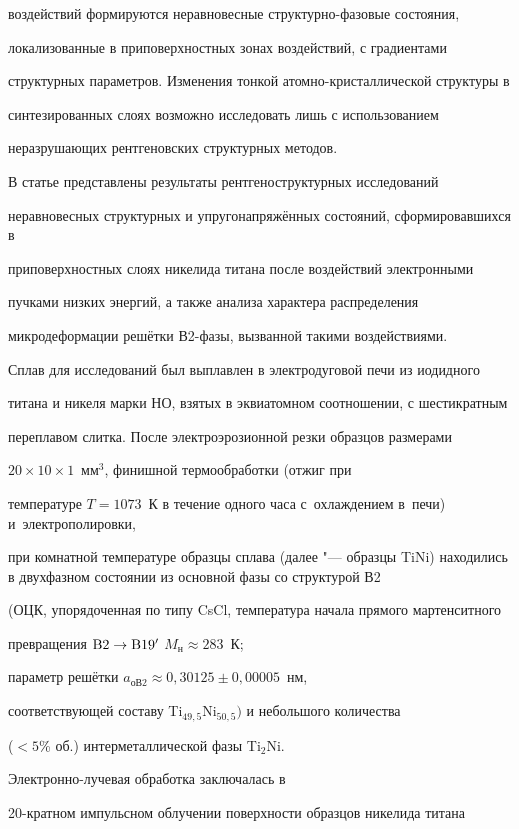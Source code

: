воздействий формируются неравновесные структурно-фазовые состояния,

локализованные в приповерхностных зонах воздействий, с градиентами

структурных параметров. Изменения тонкой атомно-кристаллической структуры в

синтезированных слоях возможно исследовать лишь с использованием

неразрушающих рентгеновских структурных методов.



В статье представлены результаты рентгеноструктурных исследований

неравновесных структурных и упругонапряжённых состояний, сформировавшихся в

приповерхностных слоях никелида титана после воздействий электронными

пучками низких энергий, а также анализа характера распределения

микродеформации решётки В2-фазы, вызванной такими воздействиями.



Сплав для исследований был выплавлен в электродуговой печи из иодидного

титана и никеля марки НО, взятых в эквиатомном соотношении, с шестикратным

переплавом слитка. После электроэрозионной резки образцов размерами

$20\times 10\times 1$~мм$^{3}$, финишной термообработки (отжиг при

температуре $T=1073$~К в течение одного часа с~охлаждением в~печи) и~электрополировки,

при комнатной температуре образцы сплава (далее "--- образцы TiNi) находились в двухфазном состоянии из основной фазы со структурой В2

(ОЦК, упорядоченная по типу CsCl, температура начала прямого мартенситного

превращения $\rm B2\to B19'$ $M_{\text{н}}\approx 283$~К;

параметр решётки $a_{\text{оВ2}}\approx 0,30125\pm 0,00005$~нм,

соответствующей составу Ti$_{49,5}$Ni$_{50,5})$ и небольшого количества

($<5${\%} об.) интерметаллической фазы Ti$_{2}$Ni.



Электронно-лучевая обработка  заключалась в

20-кратном импульсном облучении поверхности образцов никелида титана

